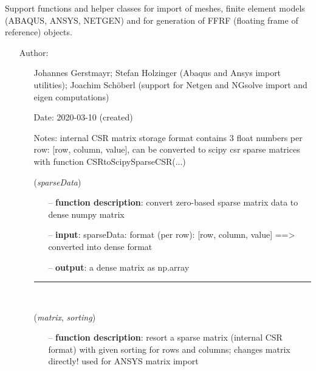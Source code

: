 \begin{itemize}[leftmargin=1.4cm]
\begin{itemize}[leftmargin=1.4cm]
\begin{itemize}[leftmargin=0.5cm]
\begin{itemize}[leftmargin=1.4cm]
%
\label{sec:module:FEM}
  Support functions and helper classes for import of meshes, finite element models (ABAQUS, ANSYS, NETGEN) and for generation of FFRF (floating frame of reference) objects.
\begin{itemize}[leftmargin=1.4cm]
\setlength{\itemindent}{-1.4cm}
\item[]Author:
\vspace{-22pt}\begin{itemize}[leftmargin=0.5cm]
\setlength{\itemindent}{-0.5cm}
\item[]   Johannes Gerstmayr; Stefan Holzinger (Abaqus and Ansys import utilities); Joachim Sch\"oberl (support for Netgen and NGsolve \cite{Schoeberl1997,NGsolve2014,NGsolve2022} import and eigen computations) 
\ei
\item[]Date:      2020-03-10 (created)
\item[]Notes:  	internal CSR matrix storage format contains 3 float numbers per row: [row, column, value], can be converted to scipy csr sparse matrices with function CSRtoScipySparseCSR(...)
\ei
\begin{flushleft}
\label{sec:FEM:CompressedRowSparseToDenseMatrix}
({\it sparseData})
\end{flushleft}
\setlength{\itemindent}{0.7cm}
\begin{itemize}[leftmargin=0.7cm]
\item[--]{\bf function description}: convert zero-based sparse matrix data to dense numpy matrix
\item[--]{\bf input}: sparseData: format (per row): [row, column, value] ==> converted into dense format
\item[--]{\bf output}: a dense matrix as np.array
\vspace{12pt}\end{itemize}
%
\noindent\rule{8cm}{0.75pt}\vspace{1pt} \\ 
\begin{flushleft}
\label{sec:FEM:MapSparseMatrixIndices}
({\it matrix}, {\it sorting})
\end{flushleft}
\setlength{\itemindent}{0.7cm}
\begin{itemize}[leftmargin=0.7cm]
\item[--]{\bf function description}: resort a sparse matrix (internal CSR format) with given sorting for rows and columns; changes matrix directly! used for ANSYS matrix import

\end{itemize}
\end{itemize}
\end{itemize}
\end{itemize}
\end{itemize}
\end{itemize}
\end{itemize}
